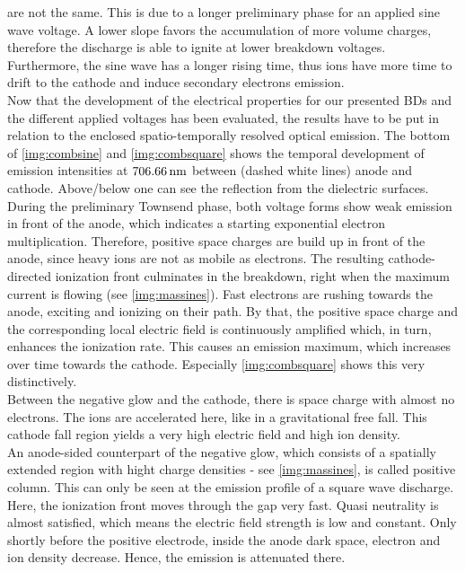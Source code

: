 \documentclass[a4paper,10pt,twoside]{article}
\begin{document}
	\begin{multicols*}{2}
		
		are not the same. This is due to a longer preliminary phase for an applied sine wave voltage. A lower slope favors the accumulation of more volume charges, therefore the discharge is able to ignite at lower breakdown voltages. Furthermore, the sine wave has a longer rising time, thus ions have more time to drift to the cathode and induce secondary electrons emission.\\					
		Now that the development of the electrical properties for our presented BDs and the different applied voltages has been evaluated, the results have to be put in relation to the enclosed spatio-temporally resolved optical emission. The bottom of \autoref{img:combsine} and \autoref{img:combsquare} shows the temporal development of emission intensities at $\unit[706.66]{nm}$ between (dashed white lines) anode and cathode. Above/below one can see the reflection from the dielectric surfaces.\\	
		During the preliminary Townsend phase, both voltage forms show weak emission in front of the anode, which indicates a starting exponential electron multiplication. Therefore, positive space charges are build up in front of the anode, since heavy ions are not as mobile as electrons. The resulting cathode-directed ionization front culminates in the breakdown, right when the maximum current is flowing (see \autoref{img:massines}). Fast electrons are rushing towards the anode, exciting and ionizing on their path. By that, the positive space charge and the corresponding local electric field is continuously amplified which, in turn, enhances the ionization rate. This causes an emission maximum, which increases over time towards the cathode. Especially \autoref{img:combsquare} shows this very distinctively.\\
		Between the negative glow and the cathode, there is space charge with almost no electrons. The ions are accelerated here, like in a gravitational free fall. This cathode fall region yields a very high electric field and high ion density.\\
		An anode-sided counterpart of the negative glow, which consists of a spatially extended region with hight charge densities - see \autoref{img:massines}, is called positive column. This can only be seen at the emission profile of a square wave discharge. Here, the ionization front moves through the gap very fast. Quasi neutrality is almost satisfied, which means the electric field strength is low and constant. Only shortly before the positive electrode, inside the anode dark space, electron and ion density decrease. Hence, the emission is attenuated there.\\

\end{multicols*}
\end{document}

